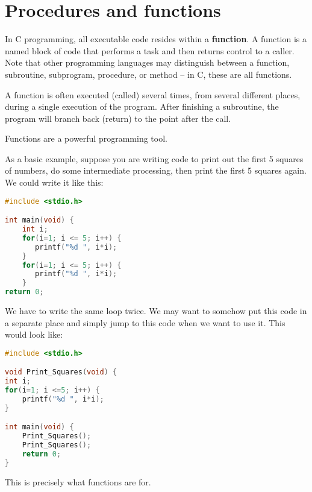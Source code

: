 \section{Procedures and functions}
In C programming, all executable code resides within a \textbf{function}. A
function is a named block of code that performs a task and then returns control
to a caller. Note that other programming languages may distinguish between a
function, subroutine, subprogram, procedure, or method --
in C, these are all functions.

A function is often executed (called) several times, from several different
places, during a single execution of the program.  After finishing a
subroutine, the program will branch back (return) to the point after the call.

Functions are a powerful programming tool.

As a basic example, suppose you are writing code to print out the first 5
squares of numbers, do some intermediate processing, then print the first 5
squares again. We could write it like this:
\lstset{basicstyle=\scriptsize, numbers=left, captionpos=b, tabsize=4}
\begin{lstlisting}[caption=Section \thesection listing \arabic{funccnt},language={C},
breaklines=true,xleftmargin=15pt, label=lst:section\thesection listing\arabic{funccnt}]
#include <stdio.h>

int main(void) {
	int i;
	for(i=1; i <= 5; i++) {
	   printf("%d ", i*i);
	}
	for(i=1; i <= 5; i++) {
	   printf("%d ", i*i);
	}
return 0;
\end{lstlisting}

We have to write the same loop twice. We may want to somehow put this code in a
separate place and simply jump to this code when we want to use it. This would
look like:
\lstset{basicstyle=\scriptsize, numbers=left, captionpos=b, tabsize=4}
\begin{lstlisting}[caption=Section \thesection listing \arabic{funccnt},language={C},
breaklines=true,xleftmargin=15pt, label=lst:section\thesection listing\arabic{funccnt}]
#include <stdio.h>

void Print_Squares(void) {
int i;
for(i=1; i <=5; i++) {
	printf("%d ", i*i);
}

int main(void) {
	Print_Squares();
	Print_Squares();
	return 0;
}
\end{lstlisting}

This is precisely what functions are for.

